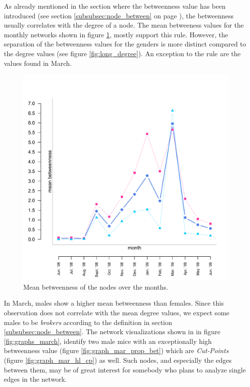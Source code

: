 As already mentioned in the section where the betweenness value has been introduced (see section \ref{subsubsec:node_between} on page \pageref{subsubsec:node_between}), the betweenness usually correlates with the degree of a node. The mean betweeness values for the monthly networks shown in figure \ref{fig:long_betweenness}, mostly support this rule. However, the separation of the betweenness values for the genders is more distinct compared to the degree values (see figure \ref{fig:long_degree}). An exception to the rule are the values found in March.   

\begin{figure}[htpb]
\begin{center}
  \includegraphics[width=.6\textwidth]{assets/pdf/long_betweenness.pdf}
  \caption[Mean betweenness of the nodes over the months]{Mean betweenness of the nodes over the months.}
  \label{fig:long_betweenness}
\end{center}
\end{figure}

In March, males show a higher mean betweenness than females. Since this observation does not correlate with the mean degree values, we expect some males to be \textit{brokers} according to the definition in section \ref{subsubsec:node_between}. The network visualizations shown in in figure \ref{fig:graphs_march}, identify two male mice with an exceptionally high betweenness value (figure \ref{fig:graph_mar_prop_bet}) which are  \textit{Cut-Points} (figure \ref{fig:graph_mar_hl_cp}) as well. Such nodes, and especially the edges between them, may be of great interest for somebody who plans to analyze single edges in the network.   

